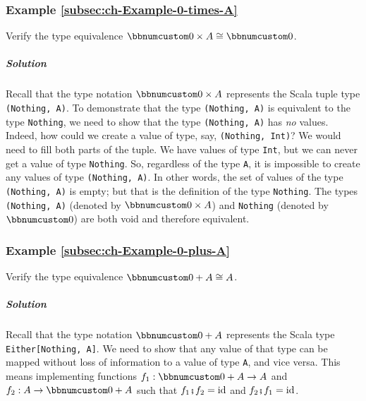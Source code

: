 \subsubsection{Example \label{subsec:ch-Example-0-times-A}\ref{subsec:ch-Example-0-times-A}}

Verify the type equivalence $\bbnum 0\times A\cong\bbnum 0$.

\subparagraph{Solution}

Recall that the type notation $\bbnum 0\times A$ represents the Scala
tuple type \lstinline!(Nothing, A)!. To demonstrate that the type
\lstinline!(Nothing, A)! is equivalent to the type \lstinline!Nothing!,
we need to show that the type \lstinline!(Nothing, A)! has \emph{no}
values. Indeed, how could we create a value of type, say, \lstinline!(Nothing, Int)!?
We would need to fill both parts of the tuple. We have values of type
\lstinline!Int!, but we can never get a value of type \lstinline!Nothing!.
So, regardless of the type \lstinline!A!, it is impossible to create
any values of type \lstinline!(Nothing, A)!. In other words, the
set of values of the type \lstinline!(Nothing, A)! is empty; but
that is the definition of the type \lstinline!Nothing!. The types
\lstinline!(Nothing, A)! (denoted by $\bbnum 0\times A$) and \lstinline!Nothing!
(denoted by $\bbnum 0$) are both void and therefore equivalent.

\subsubsection{Example \label{subsec:ch-Example-0-plus-A}\ref{subsec:ch-Example-0-plus-A}}

Verify the type equivalence $\bbnum 0+A\cong A$.

\subparagraph{Solution}

Recall that the type notation $\bbnum 0+A$ represents the Scala type
\lstinline!Either[Nothing, A]!. We need to show that any value of
that type can be mapped without loss of information to a value of
type \lstinline!A!, and vice versa. This means implementing functions
$f_{1}:\bbnum 0+A\rightarrow A$ and $f_{2}:A\rightarrow\bbnum 0+A$
such that $f_{1}\bef f_{2}=\text{id}$ and $f_{2}\bef f_{1}=\text{id}$.

